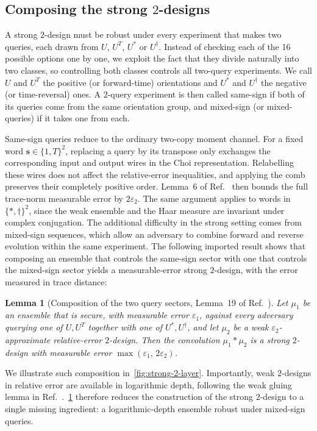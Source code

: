 \documentclass[
    aps,
    superscriptaddress,
    onecolumn,
    10pt,
    prx,
    nofootinbib
]{revtex4-2}
\newtheorem{lemma}{Lemma}
\theoremstyle{namedstatement}
\theoremstyle{plain}
\begin{document}
\subsection{Composing the strong $2$-designs}
\label{sec:composing_2}
A strong $2$-design must be robust under every experiment that makes two queries, each drawn from $U$, $U^{T}$, $U^{*}$ or $U^{\dagger}$. Instead of checking each of the 16 possible options one by one, we exploit the fact that they
divide naturally into two classes, so controlling both classes controls all two-query experiments. We call $U$ and $U^{T}$ the positive (or forward-time) orientations and $U^{*}$ and $U^{\dagger}$ the negative (or time-reversal) ones. A 2-query experiment is then called same-sign if both of its queries come from the same orientation group, and mixed-sign (or mixed-queries) if it takes one from each.

Same-sign queries reduce to the ordinary two-copy moment channel. For a fixed word $\bm{s}\in\{1,T\}^{2}$, replacing a query by its transpose only exchanges the corresponding input and output wires in the Choi representation. Relabelling these wires does not affect the relative-error inequalities, and applying the comb preserves their completely positive order. Lemma~6 of Ref.~\cite{SchusterEtAlStrong2025} then bounds the full trace-norm measurable error by $2\varepsilon_{2}$. The same argument applies to words in $\{*,\dagger\}^{2}$, since the weak ensemble and the Haar measure are invariant under complex conjugation. The additional difficulty in the strong setting comes from mixed-sign sequences, which allow an adversary to combine forward and reverse evolution within the same experiment. The following imported result shows that composing an ensemble that controls the same-sign sector with one that controls the mixed-sign sector yields a measurable-error strong $2$-design, with the error measured in trace distance:
\begin{lemma}[Composition of the two
query sectors, Lemma~19 of Ref.~\cite{FolkertsmaEtAl2026}]
\label{lem:composition}
Let $\mu_{1}$ be an ensemble that is secure, with measurable error
$\varepsilon_{1}$, against every adversary querying one of $U,U^{T}$ together
with one of $U^{*},U^{\dagger}$, and let $\mu_{2}$ be a weak
$\varepsilon_{2}$-approximate relative-error $2$-design. Then the convolution
$\mu_{1}*\mu_{2}$ is a strong $2$-design with measurable error $\max\left(\varepsilon_{1},\,2\varepsilon_{2}\right)$.
\end{lemma}


We illustrate such composition in~\cref{fig:strong-2-layer}. Importantly, weak $2$-designs in relative error are available in logarithmic depth, following the weak gluing lemma in Ref.~\cite{SchusterHaferkampHuang2025}.~\cref{lem:composition} therefore reduces the construction of the strong $2$-design to a single missing ingredient: a logarithmic-depth ensemble robust under mixed-sign queries.
\end{document}

